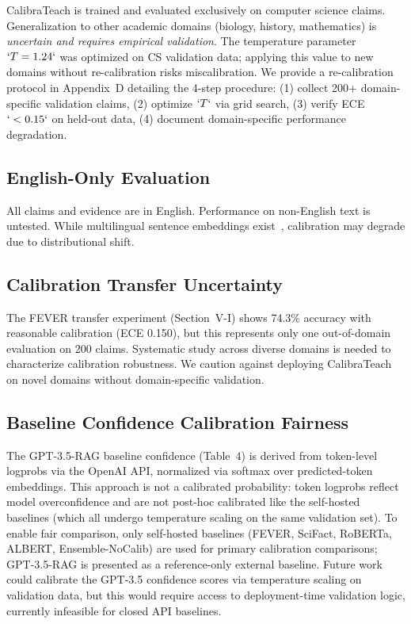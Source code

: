 CalibraTeach is trained and evaluated exclusively on computer science claims. Generalization to other academic domains (biology, history, mathematics) is \emph{uncertain and requires empirical validation}. The temperature parameter \(`T=1.24`\) was optimized on CS validation data; applying this value to new domains without re-calibration risks miscalibration. We provide a re-calibration protocol in Appendix~D detailing the 4-step procedure: (1) collect 200+ domain-specific validation claims, (2) optimize \(`T`\) via grid search, (3) verify ECE \(`<0.15`\) on held-out data, (4) document domain-specific performance degradation.

\subsection{English-Only Evaluation}\label{english-only-evaluation}

All claims and evidence are in English. Performance on non-English text is untested. While multilingual sentence embeddings exist~, calibration may degrade due to distributional shift.

\subsection{Calibration Transfer Uncertainty}\label{calibration-transfer-uncertainty}

The FEVER transfer experiment (Section~V-I) shows 74.3\% accuracy with reasonable calibration (ECE 0.150), but this represents only one out-of-domain evaluation on 200 claims. Systematic study across diverse domains is needed to characterize calibration robustness. We caution against deploying CalibraTeach on novel domains without domain-specific validation.

\subsection{Baseline Confidence Calibration Fairness}\label{baseline-confidence-calibration-fairness}

The GPT-3.5-RAG baseline confidence (Table~4) is derived from token-level logprobs via the OpenAI API, normalized via softmax over predicted-token embeddings. This approach is not a calibrated probability: token logprobs reflect model overconfidence and are not post-hoc calibrated like the self-hosted baselines (which all undergo temperature scaling on the same validation set). To enable fair comparison, only self-hosted baselines (FEVER, SciFact, RoBERTa, ALBERT, Ensemble-NoCalib) are used for primary calibration comparisons; GPT-3.5-RAG is presented as a reference-only external baseline. Future work could calibrate the GPT-3.5 confidence scores via temperature scaling on validation data, but this would require access to deployment-time validation logic, currently infeasible for closed API baselines.

